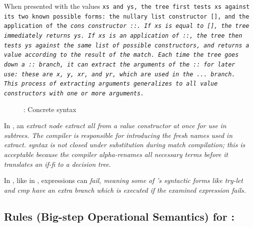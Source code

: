 \documentclass[manuscript,screen,review, 12pt, nonacm]{acmart}
\begin{document}
    When presented with the values \tt{xs} and \tt{ys}, the tree first tests
    \tt{xs} against its two known possible forms: the nullary list constructor
    \tt{[]}, and the application of the \it{cons} constructor \tt{::}. If
    \tt{xs} is equal to \tt{[]}, the tree immediately returns \tt{ys}. If
    \tt{xs} is an application of \tt{::}, the tree then tests \tt{ys} against
    the same list of possible constructors, and returns a value according to the
    result of the match. Each time the tree goes down a \tt{::} branch, it can
    extract the arguments of the \tt{::} for later use: these are \tt{x},
    \tt{y}, \tt{xr}, and \tt{yr}, which are used in the \tt{...} branch. This
    process of extracting arguments generalizes to all value constructors with
    one or more arguments. 

    \begin{figure}
      \begin{center}
      \dcsyntax
      \end{center}
      \caption{\D: Concrete syntax}
      \label{fig:dsyntax}
      \end{figure}



    In \D, an \it{extract} node extract all from a value constructor at once for
    use in subtrees. The compiler is responsible for introducing the fresh names
    used in \it{extract}. \VMinus syntax is not closed under substitution during 
    match compilation; this is acceptable because the compiler alpha-renames all
    necessary terms before it translates an \it{if-fi} to a decision tree. 

    In \D, like in \VMinus, expressions can \it{fail}, meaning some of \D's
    syntactic forms like \it{try-let} and \it{cmp} have an extra branch which is
    executed if the examined expression fails. 


    \subsection{Rules (Big-step Operational Semantics) for \D:}
    \label{dsemantics}
    
\end{document}
